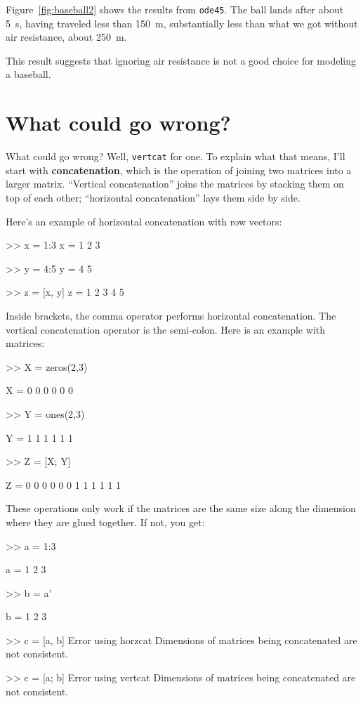 \documentclass[
]{book}
\numberwithin{Answer}{chapter}
\numberwithin{Exercise}{chapter}
\begin{document}
Figure~\ref{fig:baseball2} shows the results from {\tt ode45}.  The ball lands after about \SI{5}{\second}, having traveled less than \SI{150}{\meter}, substantially less than what we got without air resistance, about \SI{250}{\meter}.

This result suggests that ignoring air resistance is not a good choice for modeling a baseball.


\section{What could go wrong?}

What could go wrong?  Well, {\tt vertcat} for one.  To explain
what that means, I'll start with {\bf concatenation}, which is
the operation of joining two matrices into a larger matrix.
``Vertical concatenation'' joins the matrices by stacking them on
top of each other; ``horizontal concatenation'' lays them
side by side.

Here's an example of horizontal concatenation with row vectors:

\begin{code}
>> x = 1:3
x = 1     2     3

>> y = 4:5
y = 4     5

>> z = [x, y]
z = 1     2     3     4     5
\end{code}

Inside brackets, the comma operator performs horizontal concatenation.
The vertical concatenation operator is the semi-colon.  Here is an
example with matrices:

\begin{code}
>> X = zeros(2,3)

X =  0     0     0
     0     0     0

>> Y = ones(2,3)

Y =  1     1     1
     1     1     1

>> Z = [X; Y]

Z =  0     0     0
     0     0     0
     1     1     1
     1     1     1
\end{code}

These operations only work if the matrices are the same size along
the dimension where they are glued together.  If not, you get:

\begin{code}
>> a = 1:3

a = 1     2     3

>> b = a'

b =  1
     2
     3

>> c = [a, b]
Error using horzcat
Dimensions of matrices being concatenated are not consistent.

>> c = [a; b]
Error using vertcat
Dimensions of matrices being concatenated are not consistent.
\end{code}
\end{document}
